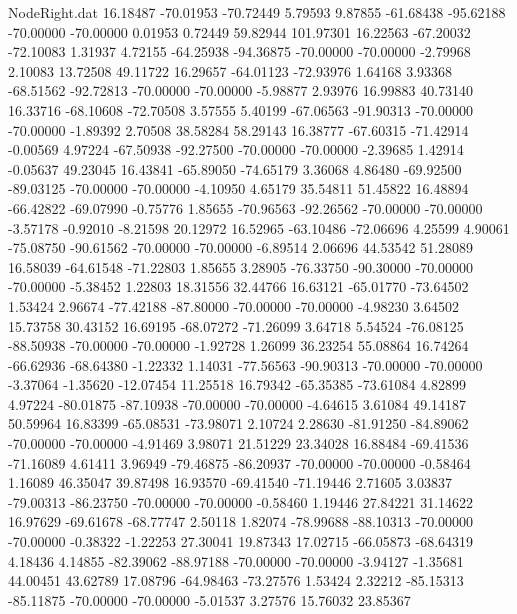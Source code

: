 \begin{filecontents}{NodeRight.dat}
  16.18487  -70.01953  -70.72449     5.79593    9.87855  -61.68438  -95.62188  -70.00000  -70.00000    0.01953    0.72449   59.82944  101.97301
  16.22563  -67.20032  -72.10083     1.31937    4.72155  -64.25938  -94.36875  -70.00000  -70.00000   -2.79968    2.10083   13.72508   49.11722
  16.29657  -64.01123  -72.93976     1.64168    3.93368  -68.51562  -92.72813  -70.00000  -70.00000   -5.98877    2.93976   16.99883   40.73140
  16.33716  -68.10608  -72.70508     3.57555    5.40199  -67.06563  -91.90313  -70.00000  -70.00000   -1.89392    2.70508   38.58284   58.29143
  16.38777  -67.60315  -71.42914    -0.00569    4.97224  -67.50938  -92.27500  -70.00000  -70.00000   -2.39685    1.42914   -0.05637   49.23045
  16.43841  -65.89050  -74.65179     3.36068    4.86480  -69.92500  -89.03125  -70.00000  -70.00000   -4.10950    4.65179   35.54811   51.45822
  16.48894  -66.42822  -69.07990    -0.75776    1.85655  -70.96563  -92.26562  -70.00000  -70.00000   -3.57178   -0.92010   -8.21598   20.12972
  16.52965  -63.10486  -72.06696     4.25599    4.90061  -75.08750  -90.61562  -70.00000  -70.00000   -6.89514    2.06696   44.53542   51.28089
  16.58039  -64.61548  -71.22803     1.85655    3.28905  -76.33750  -90.30000  -70.00000  -70.00000   -5.38452    1.22803   18.31556   32.44766
  16.63121  -65.01770  -73.64502     1.53424    2.96674  -77.42188  -87.80000  -70.00000  -70.00000   -4.98230    3.64502   15.73758   30.43152
  16.69195  -68.07272  -71.26099     3.64718    5.54524  -76.08125  -88.50938  -70.00000  -70.00000   -1.92728    1.26099   36.23254   55.08864
  16.74264  -66.62936  -68.64380    -1.22332    1.14031  -77.56563  -90.90313  -70.00000  -70.00000   -3.37064   -1.35620  -12.07454   11.25518
  16.79342  -65.35385  -73.61084     4.82899    4.97224  -80.01875  -87.10938  -70.00000  -70.00000   -4.64615    3.61084   49.14187   50.59964
  16.83399  -65.08531  -73.98071     2.10724    2.28630  -81.91250  -84.89062  -70.00000  -70.00000   -4.91469    3.98071   21.51229   23.34028
  16.88484  -69.41536  -71.16089     4.61411    3.96949  -79.46875  -86.20937  -70.00000  -70.00000   -0.58464    1.16089   46.35047   39.87498
  16.93570  -69.41540  -71.19446     2.71605    3.03837  -79.00313  -86.23750  -70.00000  -70.00000   -0.58460    1.19446   27.84221   31.14622
  16.97629  -69.61678  -68.77747     2.50118    1.82074  -78.99688  -88.10313  -70.00000  -70.00000   -0.38322   -1.22253   27.30041   19.87343
  17.02715  -66.05873  -68.64319     4.18436    4.14855  -82.39062  -88.97188  -70.00000  -70.00000   -3.94127   -1.35681   44.00451   43.62789
  17.08796  -64.98463  -73.27576     1.53424    2.32212  -85.15313  -85.11875  -70.00000  -70.00000   -5.01537    3.27576   15.76032   23.85367

\end{filecontents}

